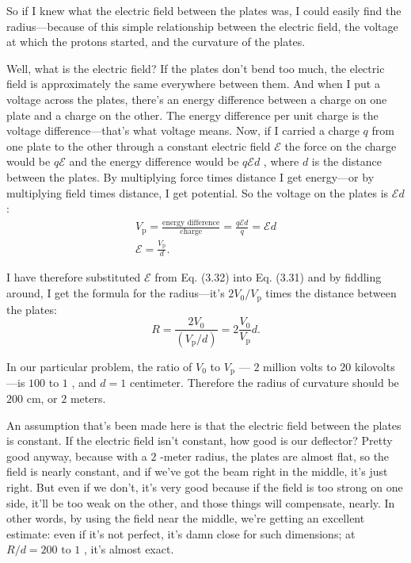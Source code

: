 \documentclass[11pt,oneside]{article}
\providecommand{\emf}{\mathcal{E}}
\begin{document}
So if I knew what the electric field between the plates was, I could easily find the radius---because of this simple relationship between the electric field, the voltage at which the protons started, and the curvature of the plates.\par

Well, what is the electric field? If the plates don't bend too much, the electric field is approximately the same everywhere between them. And when I put a voltage across the plates, there's an energy difference between a charge on one plate and a charge on the other. The energy difference per unit charge is the voltage difference---that's what voltage means. Now, if I carried a charge \(q\) from one plate to the other through a constant electric field \(\emf\) the force on the charge would be \(q\emf\) and the energy difference would be \(q\emf d\) , where \(d\) is the distance between the plates. By multiplying force times distance I get energy---or by multiplying field times distance, I get potential. So the voltage on the plates is \(\emf d\) : 
\begin{equation*} \begin{gathered} V_\text{p} = \frac{\text{energy difference}}{\text{charge}} = \frac{q\emf d}{q} = \emf d\\[1em] \emf = \frac{V_\text{p}}{d}. \end{gathered} \tag{3.32}
\label{Eq:TIPS:3:32} \end{equation*}
\par

I have therefore substituted \(\emf\) from Eq. (3.32) into Eq. (3.31) and by fiddling around, I get the formula for the radius---it's \(2V_0/V_\text{p}\) times the distance between the plates: 
\begin{equation*} \tag{3.33}
\label{Eq:TIPS:3:33} R = \frac{2V_0}{(V_\text{p}/d)} = 2\frac{V_0}{V_\text{p}}d. \end{equation*}
\par

In our particular problem, the ratio of \(V_0\) to \(V_\text{p}\) --- \(2\) million volts to \(20\) kilovolts---is \(100\) to \(1\) , and \(d=1\) centimeter. Therefore the radius of curvature should be \(200\) cm, or \(2\) meters.\par

An assumption that's been made here is that the electric field between the plates is constant. If the electric field isn't constant, how good is our deflector? Pretty good anyway, because with a \(2\) -meter radius, the plates are almost flat, so the field is nearly constant, and if we've got the beam right in the middle, it's just right. But even if we don't, it's very good because if the field is too strong on one side, it'll be too weak on the other, and those things will compensate, nearly. In other words, by using the field near the middle, we're getting an excellent estimate: even if it's not perfect, it's damn close for such dimensions; at \(R/d = 200\text{ to }1\) , it's almost exact.\par
\end{document}

